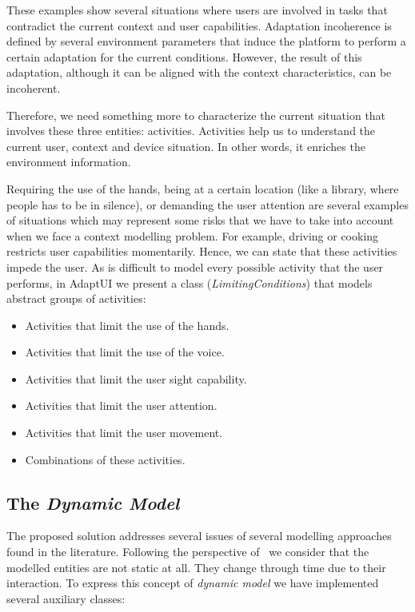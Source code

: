 These examples show several situations where users are involved in tasks that
contradict the current context and user capabilities. Adaptation incoherence is
defined by several environment parameters that induce the platform to perform a
certain adaptation for the current conditions. However, the result of this
adaptation, although it can be aligned with the context characteristics, can be
incoherent.

Therefore, we need something more to characterize the current situation that
involves these three entities: activities. Activities help us to understand the
current user, context and device situation. In other words, it enriches the
environment information.

Requiring the use of the hands, being at a certain location (like a library, where
people has to be in silence), or demanding the user attention are several examples
of situations which may represent some risks that we have to take into account
when we face a context modelling problem. For example, driving or cooking restricts
user capabilities momentarily. Hence, we can state that these activities impede
the user. As is difficult to model every possible activity that the user performs,
in AdaptUI we present a class (\textit{LimitingConditions}) that models abstract
groups of activities:

\begin{itemize}
 \item Activities that limit the use of the hands.
 \item Activities that limit the use of the voice.
 \item Activities that limit the user sight capability.
 \item Activities that limit the user attention.
 \item Activities that limit the user movement.
 \item Combinations of these activities.
\end{itemize}

\subsection{The \textit{Dynamic Model}}
\label{sec:dynamic_model}

The proposed solution addresses several issues of several modelling approaches
found in the literature. Following the perspective of~\citet{fischer_user_2001}
we consider that the modelled entities are not static at all. They change through
time due to their interaction. To express this concept of \textit{dynamic model}
we have implemented several auxiliary classes:

